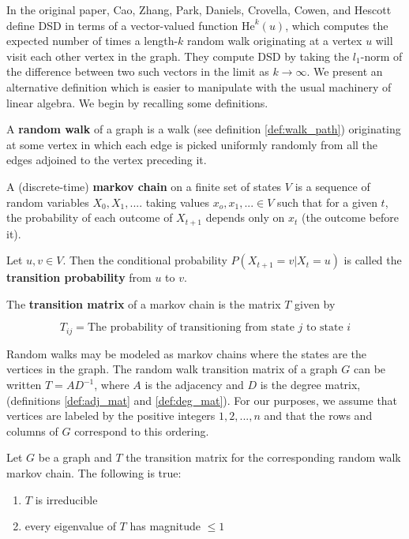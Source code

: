 In the original paper, Cao, Zhang, Park, Daniels, Crovella, Cowen, and Hescott define DSD in terms
of a vector-valued function $\mathrm{He}^{k}(u)$, which computes the expected number of times a
length-$k$ random walk originating at a vertex $u$ will visit each other vertex in the graph. They
compute DSD by taking the $l_1$-norm of the difference between two such vectors in the limit as
$k \to \infty$. We present an alternative definition which is easier to manipulate with the usual
machinery of linear algebra. We begin by recalling some definitions.

\begin{definition}
  A \textbf{random walk} of a graph is a walk (see definition \ref{def:walk_path}) originating at
  some vertex in which each edge is picked uniformly randomly from all the edges adjoined to the
  vertex preceding it.
\end{definition}

\begin{definition}
  A (discrete-time) \textbf{markov chain} on a finite set of states $V$ is a sequence of random
  variables $X_0,X_1,....$ taking values $x_o,x_1,... \in V$ such that for a given $t$, the
  probability of each outcome of $X_{t+1}$ depends only on $x_t$ (the outcome before it).

  Let $u,v \in V$. Then the conditional probability $P(X_{t+1}=v|X_t=u)$ is called the
  \textbf{transition probability} from $u$ to $v$.
  
  The \textbf{transition matrix} of a markov chain is the matrix $T$ given by

  \[
    T_{ij} = \text{The probability of transitioning from state $j$ to state $i$}
  \]
\end{definition}

Random walks may be modeled as markov chains where the states are the vertices in the graph. The
random walk transition matrix of a graph $G$ can be written $T = AD^{-1}$, where $A$ is the
adjacency and $D$ is the degree matrix, (definitions \ref{def:adj_mat} and \ref{def:deg_mat}). For
our purposes, we assume that vertices are labeled by the positive integers $1,2,...,n$ and that the
rows and columns of $G$ correspond to this ordering.

\begin{proposition}[Properties of $T$]
  Let $G$ be a graph and $T$ the transition matrix for the corresponding random walk markov chain.
  The following is true:
  \begin{enumerate}
  \item $T$ is irreducible
  \item every eigenvalue of $T$ has magnitude $\leq 1$
  \end{enumerate}
\end{proposition}

